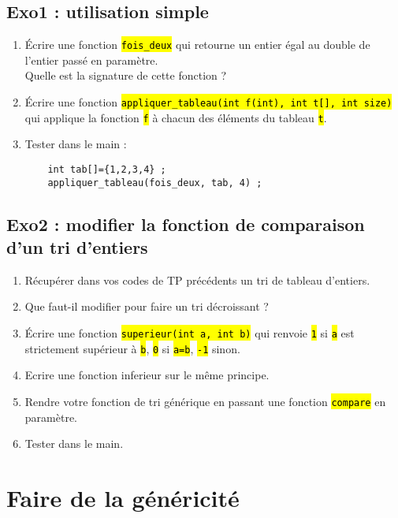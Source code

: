 \documentclass[final, pdftex, a4paper, openbib, ]{article}
\let\OldTexttt\texttt
\renewcommand{\texttt}[1]{\OldTexttt{\hl{#1}}}
\begin{document}
\subsection{Exo1 : utilisation simple}
\begin{enumerate}
	\item Écrire une fonction \texttt{fois\_deux} qui retourne un entier égal au double de l'entier passé en paramètre.\\
	Quelle est la signature de cette fonction ?
	\item Écrire une fonction \texttt{appliquer\_tableau(int f(int), int t[], int size)} qui applique la fonction \texttt{f} à chacun des éléments du tableau \texttt{t}.
	
	
	\item Tester dans le main :
	\begin{verbatim}
	int tab[]={1,2,3,4} ;
	appliquer_tableau(fois_deux, tab, 4) ;
	\end{verbatim}
\end{enumerate}


\subsection{Exo2 : modifier la fonction de comparaison d'un tri d'entiers}
\begin{enumerate}
	\item Récupérer dans vos codes de TP précédents un tri de tableau d'entiers.
	\item Que faut-il modifier pour faire un tri décroissant ?
	\item Écrire une fonction \texttt{superieur(int a, int b)} qui renvoie \texttt{1} si \texttt{a} est strictement supérieur à \texttt{b}, \texttt{0} si \texttt{a=b}, \texttt{-1}	sinon.
	\item Ecrire une fonction inferieur sur le même principe.
	\item Rendre votre fonction de tri générique en passant une fonction \texttt{compare} en paramètre.
	\item Tester dans le main.
\end{enumerate}


\section{Faire de la généricité}
\end{document}
